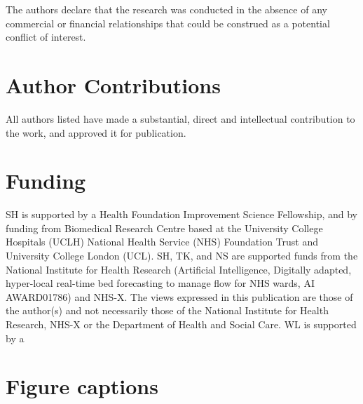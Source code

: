 \documentclass[utf8]{FrontiersinVancouver}
\begin{document}
The authors declare that the research was conducted in the absence of any commercial or financial relationships that could be construed as a potential conflict of interest.

\section*{Author Contributions}
All authors listed have made a substantial, direct and intellectual contribution to the work, and approved it for publication.

\section*{Funding}

SH is supported by a Health Foundation Improvement Science Fellowship, and by funding from 
Biomedical Research Centre based at the University College Hospitals (UCLH) National Health Service (NHS) Foundation Trust and University College London (UCL). SH, TK, and NS are supported funds from the National Institute for Health Research (Artificial Intelligence, Digitally adapted, hyper-local real-time bed forecasting to manage flow for NHS wards, AI AWARD01786) and NHS-X. The views expressed in this publication are those of the author(s) and not necessarily those of the National Institute for Health Research, NHS-X or the Department of Health and Social Care. WL is supported by a 


 



\section*{Figure captions}

\end{document}
